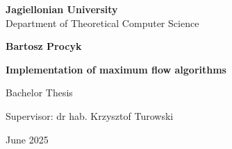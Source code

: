 \begin{titlepage}
	\begin{center}
        
		\large
		\textbf{Jagiellonian University}\\
		Department of Theoretical Computer Science\\

		\vspace{1.5cm}

		\Large
		\textbf{Bartosz Procyk}

		\vspace*{2cm}

		\textbf{\LARGE Implementation of maximum flow algorithms}
		
		\vspace{0.5cm}
		\large
		
		\vfill
		\Large
		Bachelor Thesis

		\vfill
		\Large
		Supervisor: dr hab. Krzysztof Turowski
		
		\vspace{0.8cm}
		
		June 2025
		
\end{center}
\end{titlepage}